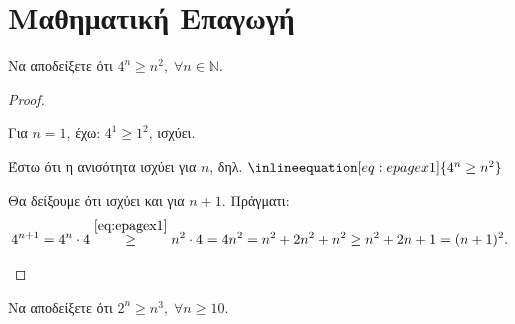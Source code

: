 \documentclass[main.tex]{subfiles}
\begin{document}
\section{Μαθηματική Επαγωγή}



\begin{example}
    Να αποδείξετε ότι $ 4^{n} \geq n^{2}, \; \forall n \in \mathbb{N} $.
\end{example}


\begin{proof}
\item {}
    \begin{myitemize}
        \item Για $ n=1 $, έχω: $ 4^{1} \geq 1^{2} $, ισχύει.
        \item Έστω ότι η ανισότητα ισχύει για $n$, δηλ. 
            $\inlineequation[eq:epagex1]{4^{n} \geq n^{2}}$
        \item Θα δείξουμε ότι ισχύει και για $ n+1 $. Πράγματι:
            \begin{align*}
                4^{n+1} = 4^{n}\cdot 4 \overset{\eqref{eq:epagex1}}{\geq}
                n^{2}\cdot 4 
                = 4n^{2} = n^{2} + 2n^{2} + n^{2} \geq n^{2} + 2n + 1 = (n+1)^{2}.
            \end{align*}
    \end{myitemize}
\end{proof}

\begin{example}
    Να αποδείξετε ότι $ 2^{n} \geq n^{3}, \; \forall n \geq 10 $.
\end{example}
\end{document}
